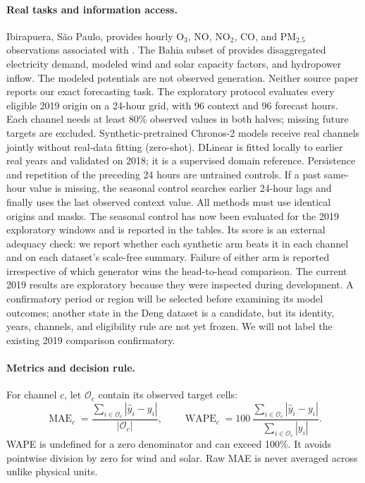 \paragraph{Real tasks and information access.}
Ibirapuera, S\~ao Paulo, provides hourly O$_3$, NO, NO$_2$, CO, and
PM$_{2.5}$ observations associated with \citet{seguel2022photochemical}.
The Bahia subset of \citet{deng2023harmonized} provides disaggregated
electricity demand, modeled wind and solar capacity factors, and hydropower
inflow. The modeled potentials are not observed generation. Neither source
paper reports our exact forecasting task. The exploratory protocol evaluates
every eligible 2019 origin on a 24-hour grid, with 96 context and 96 forecast
hours. Each channel needs at least 80\% observed values in both halves;
missing future targets are excluded. Synthetic-pretrained Chronos-2 models
receive real channels jointly without real-data fitting (zero-shot).
DLinear \citep{zeng2023transformers} is fitted locally to earlier real years
and validated on 2018; it is a supervised domain reference. Persistence and
repetition of the preceding 24 hours are untrained controls. If a past
same-hour value is missing, the seasonal control searches earlier 24-hour
lags and finally uses the last observed context value. All methods
must use identical origins and masks. The seasonal control has now been
evaluated for the 2019 exploratory windows and is reported in the tables. Its
score is an external adequacy check: we report whether each synthetic arm
beats it in each channel and on each dataset's scale-free summary. Failure
of either arm is
reported irrespective of which generator wins the head-to-head comparison.
The current 2019 results are exploratory because they were inspected during
development. A confirmatory period or region will be selected before
examining its model outcomes; another state in the Deng dataset is a
candidate, but its identity, years, channels, and eligibility rule are not
yet frozen. We will not label the existing 2019 comparison confirmatory.

\paragraph{Metrics and decision rule.}
For channel $c$, let $\mathcal O_c$ contain its observed target cells:
\begin{equation}
\operatorname{MAE}_c=\frac{\sum_{i\in\mathcal O_c}|\hat y_i-y_i|}
{|\mathcal O_c|},\qquad
\operatorname{WAPE}_c=100\,
\frac{\sum_{i\in\mathcal O_c}|\hat y_i-y_i|}
{\sum_{i\in\mathcal O_c}|y_i|}.
\label{eq:foundation-prior-errors}
\end{equation}
WAPE is undefined for a zero denominator and can exceed 100\%. It avoids
pointwise division by zero for wind and solar. Raw MAE is never averaged
across unlike physical units.

